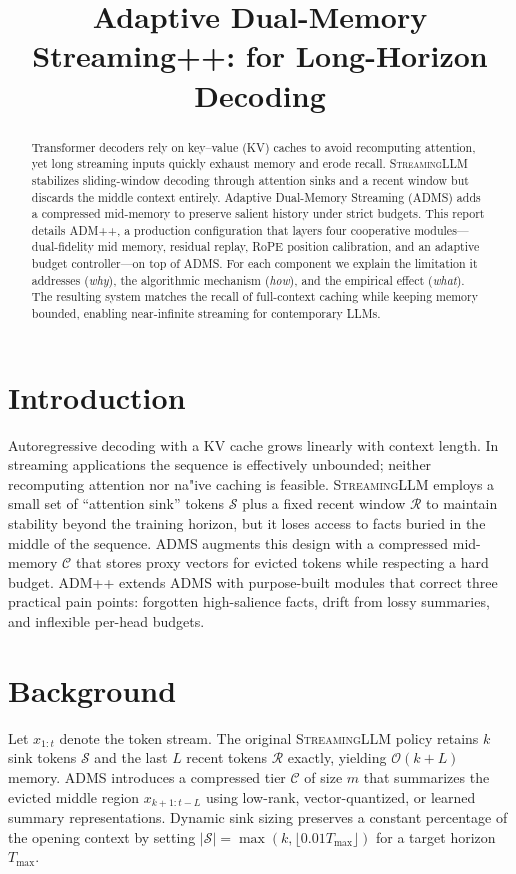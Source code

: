 \documentclass[11pt]{article}
\title{Adaptive Dual-Memory Streaming++: \admpp{} for Long-Horizon Decoding}
\author{}
\date{}
\newcommand{\model}{\textsc{ADMS}}
\newcommand{\admpp}{\textsc{ADM++}}
\newcommand{\streaming}{\textsc{StreamingLLM}}
\newcommand{\kv}{KV}
\newcommand{\sink}{\mathcal{S}}
\newcommand{\recent}{\mathcal{R}}
\newcommand{\compressed}{\mathcal{C}}
\begin{document}
\maketitle

\begin{abstract}
Transformer decoders rely on key--value (\kv{}) caches to avoid recomputing attention, yet long streaming inputs quickly exhaust memory and erode recall.
\streaming{} stabilizes sliding-window decoding through attention sinks and a recent window but discards the middle context entirely.
Adaptive Dual-Memory Streaming (\model{}) adds a compressed mid-memory to preserve salient history under strict budgets.
This report details \admpp{}, a production configuration that layers four cooperative modules---dual-fidelity mid memory, residual replay, RoPE position calibration, and an adaptive budget controller---on top of \model{}.
For each component we explain the limitation it addresses (\emph{why}), the algorithmic mechanism (\emph{how}), and the empirical effect (\emph{what}).
The resulting system matches the recall of full-context caching while keeping memory bounded, enabling near-infinite streaming for contemporary LLMs.
\end{abstract}

\section{Introduction}
Autoregressive decoding with a \kv{} cache grows linearly with context length.
In streaming applications the sequence is effectively unbounded; neither recomputing attention nor na{"i}ve caching is feasible.
\streaming{} employs a small set of ``attention sink'' tokens $\sink$ plus a fixed recent window $\recent$ to maintain stability beyond the training horizon, but it loses access to facts buried in the middle of the sequence.
\model{} augments this design with a compressed mid-memory $\compressed$ that stores proxy vectors for evicted tokens while respecting a hard budget.
\admpp{} extends \model{} with purpose-built modules that correct three practical pain points: forgotten high-salience facts, drift from lossy summaries, and inflexible per-head budgets.

\section{Background}
Let $x_{1:t}$ denote the token stream.
The original \streaming{} policy retains $k$ sink tokens $\sink$ and the last $L$ recent tokens $\recent$ exactly, yielding $\mathcal{O}(k + L)$ memory.
\model{} introduces a compressed tier $\compressed$ of size $m$ that summarizes the evicted middle region $x_{k+1:t-L}$ using low-rank, vector-quantized, or learned summary representations.
Dynamic sink sizing preserves a constant percentage of the opening context by setting $|\sink| = \max(k, \lfloor 0.01 T_{\max} \rfloor)$ for a target horizon $T_{\max}$.
\end{document}
